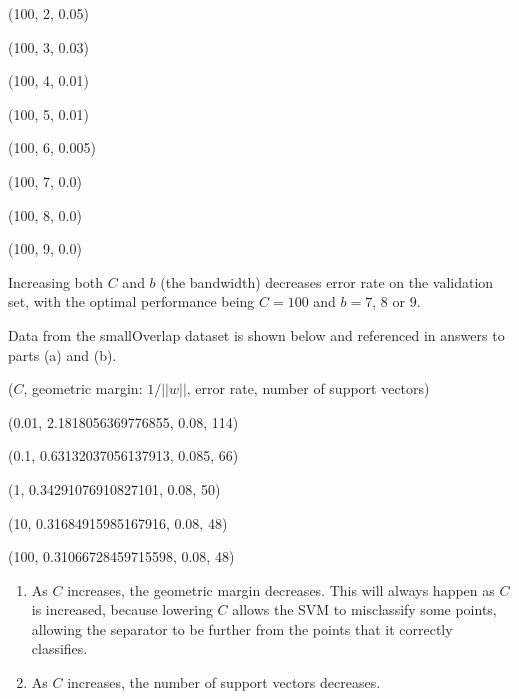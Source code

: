 \documentclass{paper}
\begin{document}
\begin{enumerate}
    (100, 2, 0.05)
    
    (100, 3, 0.03)
    
    (100, 4, 0.01)
    
    (100, 5, 0.01)
    
    (100, 6, 0.005)
    
    (100, 7, 0.0)
    
    (100, 8, 0.0)
    
    (100, 9, 0.0)

    Increasing both $C$ and $b$ (the bandwidth) decreases error rate on the validation set, with the optimal performance being $C=100$ and $b=7$, $8$ or $9$.

    Data from the smallOverlap dataset is shown below and referenced in answers to parts (a) and (b).

            ($C$, geometric margin: $1/||w||$, error rate, number of support vectors)
            
            (0.01, 2.1818056369776855, 0.08, 114)
            
            (0.1, 0.63132037056137913, 0.085, 66)
            
            (1, 0.34291076910827101, 0.08, 50)
            
            (10, 0.31684915985167916, 0.08, 48)
            
            (100, 0.31066728459715598, 0.08, 48)

    \begin{enumerate}

        \item

            As $C$ increases, the geometric margin decreases. This will always happen as $C$ is increased, because lowering $C$ allows the SVM to misclassify some points, allowing the separator to be further from the points that it correctly classifies. 

        \item

            As $C$ increases, the number of support vectors decreases.
    \end{enumerate}

\end{enumerate}
\end{document}
